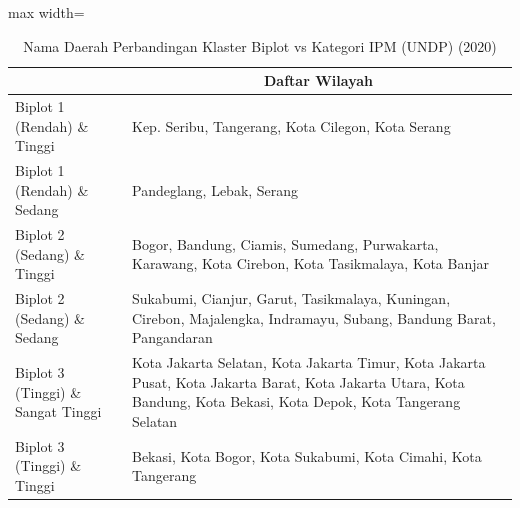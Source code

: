 \begin{table}[H]
\centering
\caption{Nama Daerah Perbandingan Klaster Biplot vs Kategori IPM (UNDP) (2020)} \label{tab:app1crossname2020}
\begin{adjustbox}{max width=\textwidth}
\begin{tabular}{|>{\centering\arraybackslash}p{4cm}|p{10cm}|}
\hline
\multicolumn{1}{|c|}{\textbf{Kategori}} & \multicolumn{1}{c|}{\textbf{Daftar Wilayah}} \\
\hline
Biplot 1 (Rendah) \& Tinggi & Kep. Seribu, Tangerang, Kota Cilegon, Kota Serang \\
\hline
Biplot 1 (Rendah) \& Sedang & Pandeglang, Lebak, Serang \\
\hline
Biplot 2 (Sedang) \& Tinggi & Bogor, Bandung, Ciamis, Sumedang, Purwakarta, Karawang, Kota Cirebon, Kota Tasikmalaya, Kota Banjar \\
\hline
Biplot 2 (Sedang) \& Sedang & Sukabumi, Cianjur, Garut, Tasikmalaya, Kuningan, Cirebon, Majalengka, Indramayu, Subang, Bandung Barat, Pangandaran \\
\hline
Biplot 3 (Tinggi) \& Sangat Tinggi & Kota Jakarta Selatan, Kota Jakarta Timur, Kota Jakarta Pusat, Kota Jakarta Barat, Kota Jakarta Utara, Kota Bandung, Kota Bekasi, Kota Depok, Kota Tangerang Selatan \\
\hline
Biplot 3 (Tinggi) \& Tinggi & Bekasi, Kota Bogor, Kota Sukabumi, Kota Cimahi, Kota Tangerang \\
\hline
\end{tabular}
\end{adjustbox}
\end{table}